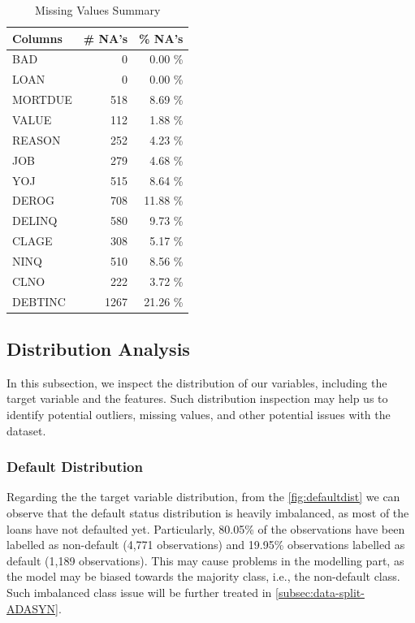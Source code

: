 \begin{table}[H]
\small
\setlength{\tabcolsep}{8pt}
\renewcommand{\arraystretch}{1.3}
\centering
\caption[Missing Values Summary]{Missing Values Summary}\label{tab:natable}
\begin{tabular}{l r r}
\toprule
\textbf{Columns} & \textbf{\# NA's} & \textbf{\% NA's}\\
\midrule
\hline
BAD & 0 & 0.00 \% \\
LOAN & 0 & 0.00 \% \\
MORTDUE & 518 & 8.69 \% \\
VALUE & 112 & 1.88 \% \\
REASON & 252 & 4.23 \% \\
JOB & 279 & 4.68 \% \\
YOJ & 515 & 8.64 \% \\
DEROG & 708 & 11.88 \% \\
DELINQ & 580 & 9.73 \% \\
CLAGE & 308 & 5.17 \% \\
NINQ & 510 & 8.56 \% \\
CLNO & 222 & 3.72 \% \\
DEBTINC & 1267 & 21.26 \% \\
\hline
\bottomrule
\end{tabular}
\vspace{0.35em}

\vspace{-1em}
\end{table}


\subsection{Distribution Analysis}
In this subsection, we inspect the distribution of our variables, including the target variable and the features.
Such distribution inspection may help us to identify potential outliers, missing values, and other potential issues with the dataset.

\subsubsection{Default Distribution}

Regarding the the target variable distribution, from the \autoref{fig:defaultdist} we can observe that the default status distribution is heavily imbalanced, as most of the loans have not defaulted yet.
Particularly, 80.05\% of the observations have been labelled as non-default (4,771 observations) and 19.95\% observations labelled as default (1,189 observations).
This may cause problems in the modelling part, as the model may be biased towards the majority class, i.e., the non-default class. Such imbalanced class issue will be further treated in \autoref{subsec:data-split-ADASYN}.

